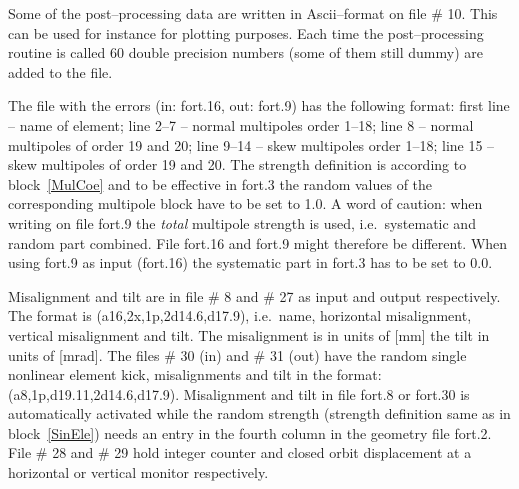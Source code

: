 \documentclass[a4paper,11pt]{report}
\begin{document}
Some of the post--processing data are written in Ascii--format on file
\# 10. This can be used for instance for plotting purposes. Each time
the post--processing routine is called 60 double precision numbers
(some of them still dummy) are added to the file.

The file with the errors (in: fort.16, out: fort.9) has the following
format: first line -- name of element; line 2--7 -- normal multipoles
order 1--18; line 8 -- normal multipoles of order 19 and 20; line
9--14 -- skew multipoles order 1--18; line 15 -- skew multipoles of
order 19 and 20. The strength definition is according to
block~\ref{MulCoe} and to be effective in fort.3 the random values of
the corresponding multipole block have to be set to 1.0. A word of
caution: when writing on file fort.9 the {\em total} \/multipole
strength is used, i.e.\ systematic and random part combined. File
fort.16 and fort.9 might therefore be different. When using fort.9 as
input (fort.16) the systematic part in fort.3 has to be set to 0.0.

Misalignment and tilt are in file \# 8 and \# 27 as input and output
respectively. The format is (a16,2x,1p,2d14.6,d17.9), i.e.\ name,
horizontal misalignment, vertical misalignment and tilt. The
misalignment is in units of [mm] the tilt in units of [mrad]. The
files \# 30 (in) and \# 31 (out) have the random single nonlinear
element kick, misalignments and tilt in the format:
(a8,1p,d19.11,2d14.6,d17.9). Misalignment and tilt in file fort.8 or
fort.30 is automatically activated while the random strength (strength
definition same as in block~\ref{SinEle}) needs an entry in the fourth
column in the geometry file fort.2. File \# 28 and \# 29 hold integer
counter and closed orbit displacement at a horizontal or vertical
monitor respectively. 

 \setcounter{dst}{0}
\end{document}

